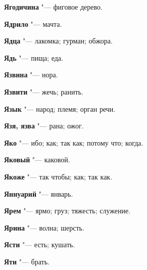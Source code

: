 \begin{mymulticols}{2}
\noindent\textbf{Ягодичина} "--- фиговое дерево. 




\noindent\textbf{Ядрило} "--- мачта. 




\noindent\textbf{Ядца} "--- лакомка; гурман; обжора. 




\noindent\textbf{Ядь} "--- пища; еда. 




\noindent\textbf{Язвина} "--- нора. 




\noindent\textbf{Язвити} "--- жечь; ранить. 




\noindent\textbf{Язык} "--- народ; племя; орган речи. 




\noindent\textbf{Язя, язва} "--- рана; ожог. 




\noindent\textbf{Яко} "--- ибо; как; так как; потому что; когда. 




\noindent\textbf{Яковый} "--- каковой. 




\noindent\textbf{Якоже} "--- так чтобы; как; так как. 




\noindent\textbf{Яннуарий} "--- январь. 




\noindent\textbf{Ярем} "--- ярмо; груз; тяжесть; служение. 




\noindent\textbf{Ярина} "--- волна; шерсть. 




\noindent\textbf{Ясти} "--- есть; кушать. 




\noindent\textbf{Яти} "--- брать. 
\normalfont\end{mymulticols}
\longpage\mychapterending


 

